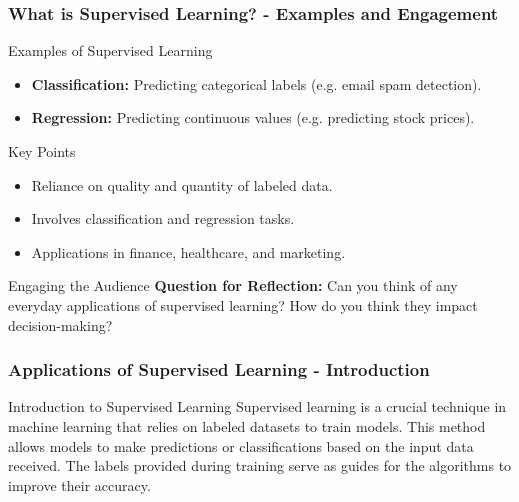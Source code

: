 \documentclass[aspectratio=169]{beamer}
\begin{document}
\begin{frame}[fragile]
    \frametitle{What is Supervised Learning? - Examples and Engagement}
    \begin{block}{Examples of Supervised Learning}
        \begin{itemize}
            \item \textbf{Classification:} Predicting categorical labels (e.g. email spam detection).
            \item \textbf{Regression:} Predicting continuous values (e.g. predicting stock prices).
        \end{itemize}
    \end{block}

    \begin{block}{Key Points}
        \begin{itemize}
            \item Reliance on quality and quantity of labeled data.
            \item Involves classification and regression tasks.
            \item Applications in finance, healthcare, and marketing.
        \end{itemize}
    \end{block}

    \begin{block}{Engaging the Audience}
        \textbf{Question for Reflection:} Can you think of any everyday applications of supervised learning? How do you think they impact decision-making?
    \end{block}
\end{frame}

\begin{frame}[fragile]
    \frametitle{Applications of Supervised Learning - Introduction}
    \begin{block}{Introduction to Supervised Learning}
        Supervised learning is a crucial technique in machine learning that relies on labeled datasets to train models. 
        This method allows models to make predictions or classifications based on the input data received. 
        The labels provided during training serve as guides for the algorithms to improve their accuracy.
    \end{block}
\end{frame}
\end{document}
